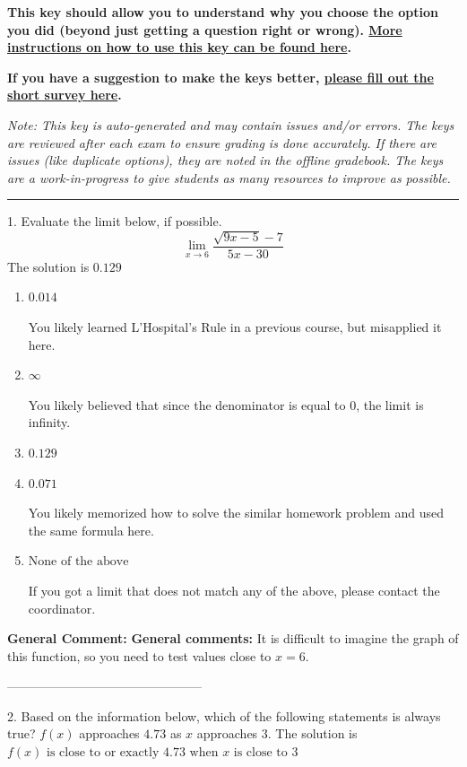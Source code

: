 \documentclass{extbook}[14pt]
\begin{document}
\textbf{This key should allow you to understand why you choose the option you did (beyond just getting a question right or wrong). \href{https://xronos.clas.ufl.edu/mac1105spring2020/courseDescriptionAndMisc/Exams/LearningFromResults}{More instructions on how to use this key can be found here}.}

\textbf{If you have a suggestion to make the keys better, \href{https://forms.gle/CZkbZmPbC9XALEE88}{please fill out the short survey here}.}

\textit{Note: This key is auto-generated and may contain issues and/or errors. The keys are reviewed after each exam to ensure grading is done accurately. If there are issues (like duplicate options), they are noted in the offline gradebook. The keys are a work-in-progress to give students as many resources to improve as possible.}

\rule{\textwidth}{0.4pt}

1. Evaluate the limit below, if possible.
\[ \lim_{x \rightarrow 6} \frac{\sqrt{9x - 5} - 7}{5x - 30} \] 
The solution is $ 0.129 $ 

\begin{enumerate}[label=\Alph*.] 
\item $ 0.014 $ 

 You likely learned L'Hospital's Rule in a previous course, but misapplied it here. 
\item $ \infty $ 

 You likely believed that since the denominator is equal to 0, the limit is infinity. 
\item $ 0.129 $ 

  
\item $ 0.071 $ 

 You likely memorized how to solve the similar homework problem and used the same formula here. 
\item $ \text{None of the above} $ 

 If you got a limit that does not match any of the above, please contact the coordinator. 
\end{enumerate} 
 
\textbf{General Comment:} \textbf{General comments:} It is difficult to imagine the graph of this function, so you need to test values close to $x = 6$. 

-----------------------------------------------

2. Based on the information below, which of the following statements is always true?
$f(x)$ approaches $4.73$ as $x$ approaches $3$. 
The solution is $ f(x) \text{ is close to or exactly } 4.73 \text{ when } x \text{ is close to } 3 $ 
\end{document}
